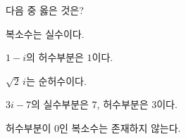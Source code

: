다음 중 옳은 것은?
\begin{choicesv}{\rule[-3ex]{0pt}{8ex}복소수는 실수이다.}{\rule[-3ex]{0pt}{8ex}$1-i$의 허수부분은 $1$이다.}{\rule[-3ex]{0pt}{8ex}$\sqrt{2}\,i$는 순허수이다.}{\rule[-3ex]{0pt}{8ex}$3i-7$의 실수부분은 $7$, 허수부분은 $3$이다.}{\rule[-3ex]{0pt}{8ex}허수부분이 $0$인 복소수는 존재하지 않는다.}\end{choicesv}
